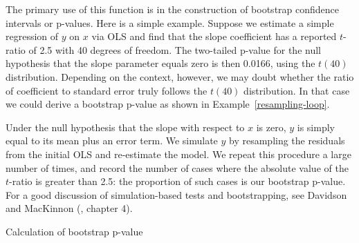 The primary use of this function is in the construction of bootstrap
confidence intervals or p-values.  Here is a simple example.  Suppose
we estimate a simple regression of $y$ on $x$ via OLS and find that
the slope coefficient has a reported $t$-ratio of 2.5 with 40 degrees
of freedom.  The two-tailed p-value for the null hypothesis that the
slope parameter equals zero is then 0.0166, using the $t(40)$
distribution.  Depending on the context, however, we may doubt whether
the ratio of coefficient to standard error truly follows the $t(40)$
distribution.  In that case we could derive a bootstrap p-value as
shown in Example~\ref{resampling-loop}.  

Under the null hypothesis that the slope with respect to $x$ is zero,
$y$ is simply equal to its mean plus an error term.  We simulate $y$
by resampling the residuals from the initial OLS and re-estimate the
model.  We repeat this procedure a large number of times, and record
the number of cases where the absolute value of the $t$-ratio is
greater than 2.5: the proportion of such cases is our bootstrap
p-value.  For a good discussion of simulation-based tests and
bootstrapping, see Davidson and MacKinnon
(\citeyear{davidson-mackinnon04}, chapter 4).

\begin{script}[htbp]
  \caption{Calculation of bootstrap p-value}
  \label{resampling-loop}
\end{script}

    

